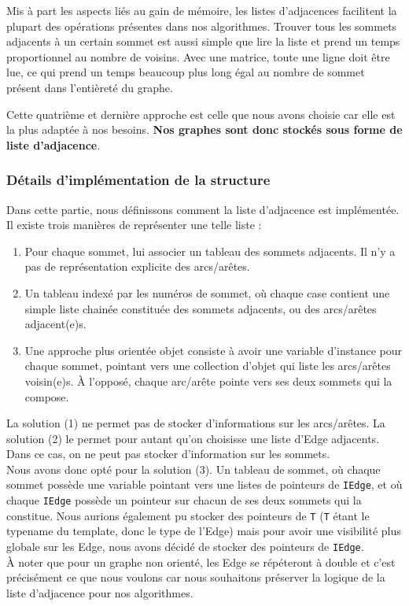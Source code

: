 \documentclass[french]{article}
\begin{document}
			Mis à part les aspects liés au gain de mémoire, les listes d'adjacences facilitent la plupart des opérations présentes dans nos algorithmes.
			Trouver tous les sommets adjacents à un certain sommet est aussi simple que lire la liste et prend un temps proportionnel au nombre de voisins. Avec une matrice, toute une ligne doit être lue, ce qui prend un temps beaucoup plus long égal au nombre de sommet présent dans l'entièreté du graphe.
			
			Cette quatrième et dernière approche est celle que nous avons choisie car elle est la plus adaptée à nos besoins. \textbf{Nos graphes sont donc stockés sous forme de liste d'adjacence}.
			
			\subsubsection{Détails d'implémentation de la structure}
			Dans cette partie, nous définissons comment la liste d'adjacence est implémentée. Il existe trois manières de représenter une telle liste :
			\begin{enumerate}
				\item Pour chaque sommet, lui associer un tableau des sommets adjacents. Il n'y a pas de représentation explicite des arcs/arêtes.
				\item Un tableau indexé par les numéros de sommet, où chaque case contient une simple liste chainée constituée des sommets adjacents, ou des arcs/arêtes adjacent(e)s.
				\item Une approche plus orientée objet consiste à avoir une variable d'instance pour chaque sommet, pointant vers une collection d'objet qui liste les arcs/arêtes voisin(e)s. À l'opposé, chaque arc/arête pointe vers ses deux sommets qui la compose. 
			\end{enumerate}
			La solution (1) ne permet pas de stocker d'informations sur les arcs/arêtes. La solution (2) le permet pour autant qu'on choisisse une liste d'Edge adjacents. Dans ce cas, on ne peut pas stocker d'information sur les sommets.\\
			
			Nous avons donc opté pour la solution (3). Un tableau de sommet, où chaque sommet possède une variable pointant vers une listes de pointeurs de \lstinline[basicstyle=\ttfamily\color{blue}]|IEdge|, et où chaque \lstinline[basicstyle=\ttfamily\color{blue}]|IEdge| possède un pointeur sur chacun de ses deux sommets qui la constitue. Nous aurions également pu stocker des pointeurs de \lstinline[basicstyle=\ttfamily\color{blue}]|T| (\lstinline[basicstyle=\ttfamily\color{blue}]|T| étant le typename du template, donc le type de l'Edge) mais pour avoir une visibilité plus globale sur les Edge, nous avons décidé de stocker des pointeurs de \lstinline[basicstyle=\ttfamily\color{blue}]|IEdge|.\\
			À noter que pour un graphe non orienté, les Edge se répéteront à double et c'est précisément ce que nous voulons car nous souhaitons préserver la logique de la liste d'adjacence pour nos algorithmes.\\
			
\end{document}
